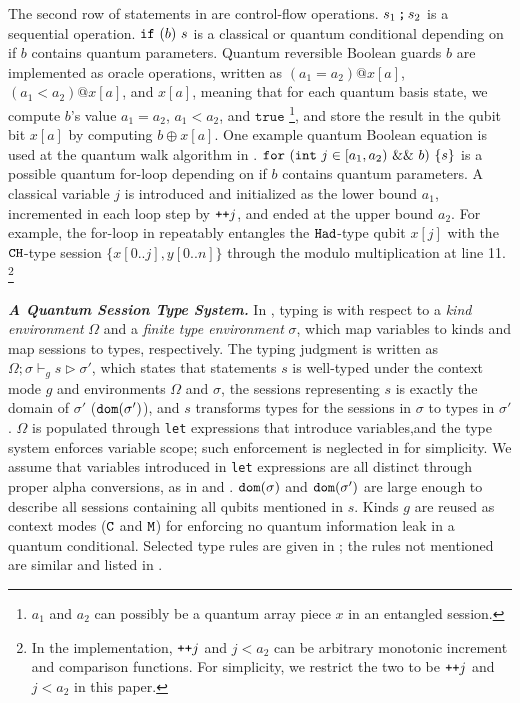 The second row of statements in  are control-flow operations.
${s_1}\,\texttt{;}\,{s_2}$ is a sequential operation.
$\texttt{if}~{(b)}~{s}$ is a classical or quantum conditional depending on if $b$ contains quantum parameters.
Quantum reversible Boolean guards $b$ are implemented as \oqasm oracle operations, written as $(a_1 = a_2) @ x[a]$, $(a_1 < a_2) @ x[a]$, and $x[a]$, meaning that for each quantum basis state, we compute $b$'s value $a_1 = a_2$, $a_1 < a_2$, and $\texttt{true}$ \footnote{$a_1$ and $a_2$ can possibly be a quantum array piece $x$ in an entangled session.}, and store the result in the qubit bit $x[a]$ by computing $b \oplus x[a]$.
One example quantum Boolean equation is used at the quantum walk algorithm in .
$\texttt{for}~{(\texttt{int}~j \in [a_1,a_2)~\&\&~b)}~\{s\}$ is a possible quantum for-loop depending on if $b$ contains quantum parameters.
A classical variable $j$ is introduced and initialized as the lower bound $a_1$, incremented in each loop step by $\texttt{++}j$, and ended at the upper bound $a_2$.
For example, the for-loop in  repeatably entangles the $\texttt{Had}$-type qubit $x[j]$ with the $\texttt{CH}$-type session $\{x[0..j],y[0..n]\}$ through the modulo multiplication at line 11. 
\footnote{In the \qafny implementation, $\texttt{++}j$ and $j<a_2$ can be arbitrary monotonic increment and comparison functions. For simplicity, we restrict the two to be $\texttt{++}j$ and $j<a_2$ in this paper.}

\noindent\textbf{\textit{A Quantum Session Type System.}}\label{sec:type-checking}
%
In \qafny, typing is with respect to a \emph{kind environment} $\Omega$ and a \emph{finite type environment} $\sigma$,
which map \qafny variables to kinds and map sessions to types, respectively.
The typing judgment is written as $\Omega; \sigma\vdash_{g} s \triangleright \sigma'$,
which states that statements $s$ is well-typed under the context mode $g$ and environments $\Omega$ and $\sigma$,
the sessions representing $s$ is exactly the domain of $\sigma'$ ($\mathtt{dom}(\sigma')$),
and $s$ transforms types for the sessions in $\sigma$ to types in $\sigma'$.
$\Omega$ is populated through \texttt{let} expressions that introduce variables,and 
the type system enforces variable scope; such enforcement is neglected in  for simplicity.
We assume that variables introduced in \texttt{let} expressions are all distinct through proper alpha conversions, as in  and .
$\mathtt{dom}(\sigma)$ and $\mathtt{dom}(\sigma')$ are large enough to describe all sessions containing all qubits mentioned in $s$.
Kinds $g$ are reused as context modes ($\texttt{C}$ and $\texttt{M}$) for enforcing no quantum information leak in a quantum conditional.
Selected type rules are given in ; the rules not mentioned are similar and listed in .

